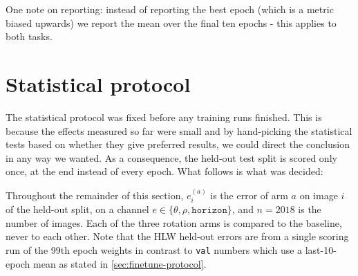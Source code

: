 \documentclass[final_report.tex]{subfiles}
\begin{document}
One note on reporting: instead of reporting the best epoch (which is a metric biased upwards) we report the mean over the final ten epochs - this applies to both tasks.

\section{Statistical protocol}\label{sec:statistical-protocol}
The statistical protocol was fixed before any training runs finished. This is because the effects measured so far were small and by hand-picking the statistical tests based on whether they give preferred results, we could direct the conclusion in any way we wanted. As a consequence, the held-out test split is scored only once, at the end instead of every epoch. What follows is what was decided:

Throughout the remainder of this section, $e^{(a)}_i$ is the error of arm $a$ on image $i$ of the held-out split, on a channel $e \in \{\theta, \rho, \texttt{horizon}\}$, and $n = 2018$ is the number of images. Each of the three rotation arms is compared to the baseline, never to each other. Note that the HLW held-out errors are from a single scoring run of the 99th epoch weights in contrast to \texttt{val} numbers which use a last-10-epoch mean as stated in \cref{sec:finetune-protocol}.
\end{document}
